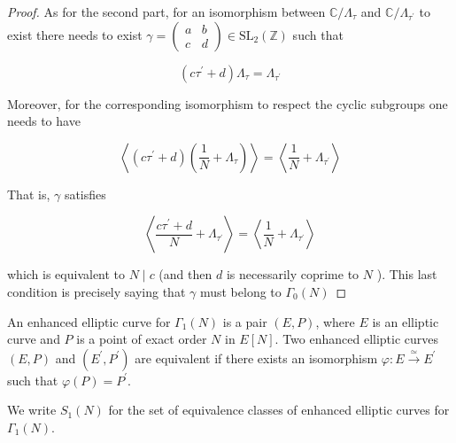 \begin{proposition}
\begin{proof}
As for the second part, for an isomorphism between $\mathbb{C} / \Lambda_{\tau}$ and $\mathbb{C} / \Lambda_{\tau^{\prime}}$ to exist there needs to exist $\gamma=\left(\begin{array}{ll}a & b \\ c & d\end{array}\right) \in \mathrm{SL}_{2}(\mathbb{Z})$ such that

$$
\left(c \tau^{\prime}+d\right) \Lambda_{\tau}=\Lambda_{\tau^{\prime}}
$$

Moreover, for the corresponding isomorphism to respect the cyclic subgroups one needs to have

$$
\left\langle\left(c \tau^{\prime}+d\right)\left(\frac{1}{N}+\Lambda_{\tau}\right)\right\rangle=\left\langle\frac{1}{N}+\Lambda_{\tau^{\prime}}\right\rangle
$$

That is, $\gamma$ satisfies

$$
\left\langle\frac{c \tau^{\prime}+d}{N}+\Lambda_{\tau^{\prime}}\right\rangle=\left\langle\frac{1}{N}+\Lambda_{\tau^{\prime}}\right\rangle
$$

which is equivalent to $N \mid c$ (and then $d$ is necessarily coprime to $N$ ). This last condition is precisely saying that $\gamma$ must belong to $\Gamma_{0}(N)$

\end{proof}
\end{proposition}

\begin{definition}
    An enhanced elliptic curve for $\Gamma_{1}(N)$ is a pair $(E, P)$, where $E$ is an elliptic curve and $P$ is a point of exact order $N$ in $E[N]$. Two enhanced elliptic curves $(E, P)$ and $\left(E^{\prime}, P^{\prime}\right)$ are equivalent if there exists an isomorphism $\varphi: E \stackrel{\simeq}{\rightarrow} E^{\prime}$ such that $\varphi(P)=P^{\prime}$.

We write $S_{1}(N)$ for the set of equivalence classes of enhanced elliptic curves for $\Gamma_{1}(N)$.

\end{definition}

